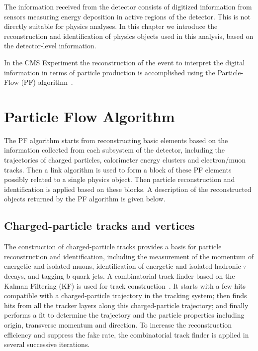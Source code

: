 The information received from the detector consists of digitized information from sensors measuring energy deposition in active regions of the detector. This is not directly suitable for physics analyses. In this chapter we introduce the reconstruction and identification of physics objects used in this analysis, based on the detector-level information. 

\vspace{0.3cm}
In the CMS Experiment the reconstruction of the event to interpret the digital information in terms of particle production is accomplished using the Particle-Flow (PF) algorithm~\cite{ob_pf}.

\section{Particle Flow Algorithm}
The PF algorithm starts from reconstructing basic elements based on the information collected from each subsystem of the detector, including the trajectories of charged particles, calorimeter energy clusters and electron/muon tracks. Then a link algorithm is used to form a block of these PF elements possibly related to a single physics object. Then particle reconstruction and identification is applied based on these blocks. A description of the reconstructed objects returned by the PF algorithm is given below.

\subsection{Charged-particle tracks and vertices}
The construction of charged-particle tracks provides a basis for particle reconstruction and identification, including the measurement of the momentum of energetic and isolated muons, identification of energetic and isolated hadronic $\tau$ decays, and tagging b quark jets. A combinatorial track finder based on the Kalman Filtering (KF) is used for track construction~\cite{ob_trackconst1,ob_trackconst2}. It starts with a few hits compatible with a charged-particle trajectory in the tracking system; then finds hits from all the tracker layers along this charged-particle trajectory; and finally performs a fit to determine the trajectory and the particle properties including origin, transverse momentum and direction. To increase the reconstruction efficiency and suppress the fake rate, the combinatorial track finder is applied in several successive iterations.

